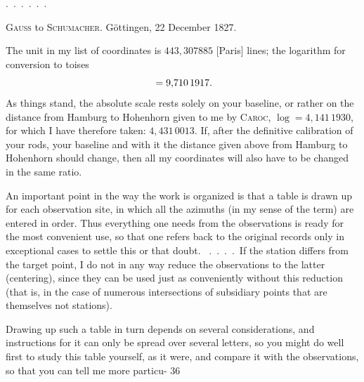 \noindent\hspace*{1.5em}.\ .\ .\ .\ .\ .

\vspace{2cm}
\begin{center}
\textsc{Gauss} to \textsc{Schumacher}. Göttingen, 22 December 1827.
\end{center}
The unit in my list of coordinates is $443{,}307885$ [Paris] lines; the logarithm for conversion to toises
\[
\llap{\raisebox{1.2ex}{\text{\tiny.}}\hspace{4cm}}=9{,}710\,1917.
\]
As things stand, the absolute scale rests solely on your baseline, or rather on the distance from Hamburg to Hohenhorn given to me by \textsc{Caroc}, $\log=4{,}141\,1930$, for which I have therefore taken: $4{,}431\,0013$. If, after the definitive calibration of your rods, your baseline and with it the distance given above from Hamburg to Hohenhorn should change, then all my coordinates will also have to be changed in the same ratio.

An important point in the way the work is organized is that a table is drawn up for each observation site, in which all the azimuths (in my sense of the term) are entered in order. Thus everything one needs from the observations is ready for the most convenient use, so that one refers back to the original records only in exceptional cases to settle this or that doubt. \ .\ .\ .\ .\ If the station differs from the target point, I do not in any way reduce the observations to the latter (centering), since they can be used just as conveniently without this reduction (that is, in the case of numerous intersections of subsidiary points that are themselves not stations).

\noindent\hfill\raisebox{.3ex}{\textbullet}\hspace*{1.2cm}\par
Drawing up such a table in turn depends on several considerations, and instructions for it can only be spread over several letters, so you might do well first to study this table yourself, as it were, and compare it with the observations, so that you can tell me more particu-
\vfill
{}\hfill36
\endgroup


